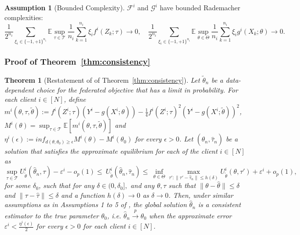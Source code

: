 \documentclass{article}
\let\cite\relax
\newcommand*{\cite}{\citep}
\def\gF{{\mathcal{F}}}
\def\gG{{\mathcal{G}}}
\def\gT{{\mathcal{T}}}
\newtheorem{theorem}{Theorem}%
\theoremstyle{definition}
\newtheorem{assumption}{Assumption}%
\begin{document}
\begin{assumption}[Bounded Complexity]
\label{asm:complexity_consistency}
    $\gF^i$ and $\gG^i$ have bounded Rademacher complexities:
    \begin{equation*}
        \frac{1}{2^{n_i}}
    \sum_{\xi_i\in\{-1,+1\}^{n_i}}\mathbb{E}\sup_{\tau\in\gT}\frac{1}{n_i}\sum_{k=1}^{n_i}\xi_if^i(Z_k;\tau)\rightarrow 0, \quad \frac{1}{2^{n_i}}\sum_{\xi_i\in\{-1,+1\}^{n_i}}\mathbb{E}\sup_{\theta\in\Theta}\frac{1}{n_i}\sum_{k=1}^{n_i}\xi_ig^i(X_k;\theta)\rightarrow 0.
    \end{equation*}
\end{assumption}
\subsubsection{Proof of Theorem~\ref{thm:consistency}}
\begin{theorem}[Restatement of of Theorem~\ref{thm:consistency}]
	Let $\tilde\theta_{n}$ be a data-dependent choice for the federated objective that has a limit in probability. For each client $i\in[N]$, define $        m^i(\theta,\tau,\tilde{\theta}):=f^i(Z^i;\tau)(Y^i-g(X^i;\theta))-\frac{1}{4}f^i(Z^i;\tau)^2(Y^i-g(X^i;\tilde{\theta}))^2$, $ M^i(\theta)=\sup_{\tau \in \gT}\mathbb{E}[m^i(\theta,\tau,\tilde{\theta})]$ and  $\eta^i(\epsilon):=inf_{d(\theta,\theta_0)\ge\epsilon}M^i(\theta)-M^i(\theta_0)$ for every $\epsilon>0$. Let $(\hat\theta_{n},\hat\tau_{n})$ be a solution that satisfies the approximate equilibrium for each of the client $i\in[N]$ as
		\[
		\sup_{\tau\in\gT}  U_{\tilde\theta}^i(\hat\theta_{n},\tau)-\varepsilon^i - o_p(1)\leq  ~U^i_{\tilde\theta}(\hat\theta_{n},\hat\tau_{n})\leq ~\inf_{\theta\in\Theta} {\max_{{\tau\prime : \|\tau\prime-\hat\tau_{n}\|\leq h(\delta)}} U^i_{\tilde\theta}(\theta,\tau\prime)}+\varepsilon^i+o_p(1),
		\]
	for some $\delta_0$, such that for any $\delta\in(0,\delta_0],$ and any $\theta,\tau$ such that $\|\theta-\hat\theta\|\leq \delta$ and $\|\tau-\hat\tau\|\leq\delta$  and a function $h(\delta)\rightarrow0$ as $\delta\rightarrow0$. Then, under similar assumptions as in Assumptions 1 to 5 of \cite{bennett2019deep}, the global solution $\hat\theta_{n}$ is a consistent estimator to the true parameter $\theta_0$, i.e. $\hat\theta_{n}\xrightarrow{p}\theta_0$ when the approximate error $\varepsilon^i<\frac{\eta^i(\epsilon)}{2}$ for every $\epsilon>0$ for each client $i\in[N]$.
\end{theorem} 
\end{document}
